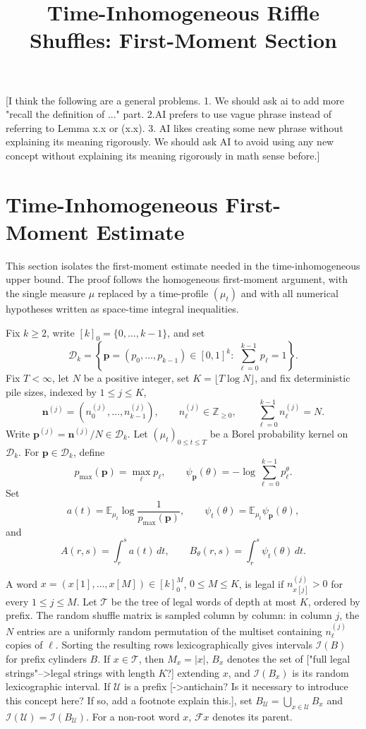 \documentclass[11pt]{article}
\title{Time-Inhomogeneous Riffle Shuffles: First-Moment Section}
\author{}
\date{}
\newcommand{\cD}{\mathcal D}
\newcommand{\cI}{\mathcal I}
\newcommand{\cT}{\mathcal T}
\newcommand{\cU}{\mathcal U}
\newcommand{\E}{\mathbb E}
\newcommand{\bp}{\mathbf p}
\newcommand{\bn}{\mathbf n}
\newcommand{\jscomment}[1]{\textup{\textsf{\color{blue}[#1]}}}
\begin{document}
\maketitle

\jscomment{I think the following are a general problems. 1. We should ask ai to add more "recall the definition of ..." part. 2.AI prefers to use vague phrase instead of referring to Lemma x.x or (x.x). 3. AI likes creating some new phrase without explaining its meaning rigorously. We should ask AI to avoid using any new concept without explaining its meaning rigorously in math sense before.}

\section{Time-Inhomogeneous First-Moment Estimate}

This section isolates the first-moment estimate needed in the
time-inhomogeneous upper bound. The proof follows the homogeneous
first-moment argument, with the single measure \(\mu\) replaced by a
time-profile \((\mu_t)\) and with all numerical hypotheses written as
space-time integral inequalities.

Fix \(k\ge2\), write \([k]_0=\{0,\ldots,k-1\}\), and set
\[
    \cD_k=\left\{\bp=(p_0,\ldots,p_{k-1})\in[0,1]^k:\ \sum_{\ell=0}^{k-1}p_\ell=1\right\}.
\]
Fix \(T<\infty\), let \(N\) be a positive integer, set
\(K=\lfloor T\log N\rfloor\), and fix deterministic pile sizes, indexed
by \(1\le j\le K\),
\[
    \bn^{(j)}=(n_0^{(j)},\ldots,n_{k-1}^{(j)}),\qquad
    n_\ell^{(j)}\in\mathbb Z_{\ge0},\qquad
    \sum_{\ell=0}^{k-1}n_\ell^{(j)}=N .
\]
Write \(\bp^{(j)}=\bn^{(j)}/N\in\cD_k\). Let \((\mu_t)_{0\le t\le T}\) be a Borel probability kernel on \(\cD_k\). For \(\bp\in\cD_k\), define
\[
    p_{\max}(\bp)=\max_\ell p_\ell,
    \qquad
    \psi_{\bp}(\theta)=-\log\sum_{\ell=0}^{k-1}p_\ell^\theta .
\]
Set
\[
    a(t)=\E_{\mu_t}\log\frac1{p_{\max}(\bp)},\qquad
    \psi_t(\theta)=\E_{\mu_t}\psi_{\bp}(\theta),
\]
and
\[
    A(r,s)=\int_r^s a(t)\,dt,\qquad
    B_\theta(r,s)=\int_r^s\psi_t(\theta)\,dt .
\]

A word \(x=(x[1],\ldots,x[M])\in[k]_0^M\), \(0\le M\le K\),
is legal if \(n_{x[j]}^{(j)}>0\) for every \(1\le j\le M\). Let
\(\cT\) be the tree of legal words of depth at most \(K\), ordered by
prefix. The random shuffle matrix is sampled column by column: in column
\(j\), the \(N\) entries are a uniformly random permutation of the
multiset containing \(n_\ell^{(j)}\) copies of \(\ell\). Sorting the
resulting rows lexicographically gives intervals \(\cI(B)\) for prefix
cylinders \(B\). If \(x\in\cT\), then \(M_x=|x|\), \(B_x\) denotes the
set of \jscomment{"full legal strings"-->legal strings with length $K$?} extending \(x\), and \(\cI(B_x)\) is its random
lexicographic interval. If \(\cU\) is a prefix \jscomment{->antichain? Is it necessary to introduce this concept here? If so, add a footnote explain this.}, set
\(B_\cU=\bigcup_{x\in\cU}B_x\) and
\(\cI(\cU)=\cI(B_\cU)\). For a non-root word \(x\), \(\mathcal F x\)
denotes its parent.
\end{document}
